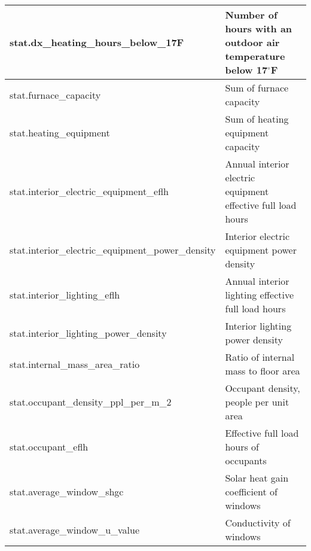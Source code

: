 \begin{center}
\begin{longtable}{|p{3in}|p{3in}|}
stat.dx\_heating\_hours\_below\_17F                        & Number of hours with an outdoor air temperature below 17$^{\circ}$F                                                             \\ \hline
stat.furnace\_capacity                                     & Sum of furnace capacity                                                                                               \\ \hline
stat.heating\_equipment                                    & Sum of heating equipment capacity                                                                                     \\ \hline
stat.interior\_electric\_equipment\_eflh                   & Annual interior electric equipment effective full load hours                                                          \\ \hline
stat.interior\_electric\_equipment\_power\_density         & Interior electric equipment power density                                                                             \\ \hline
stat.interior\_lighting\_eflh                              & Annual interior lighting effective full load hours                                                                    \\ \hline
stat.interior\_lighting\_power\_density                    & Interior lighting power density                                                                              \\ \hline
stat.internal\_mass\_area\_ratio                           & Ratio of internal mass to floor area                                                                                  \\ \hline
stat.occupant\_density\_ppl\_per\_m\_2                     & Occupant density, people per unit area                                                                                \\ \hline
stat.occupant\_eflh                                        & Effective full load hours of occupants                                                                                \\ \hline
stat.average\_window\_shgc                                 & Solar heat gain coefficient of windows                                                                                \\ \hline
stat.average\_window\_u\_value                             & Conductivity of windows                                                                                               \\ \hline

\end{longtable}
\end{center}
